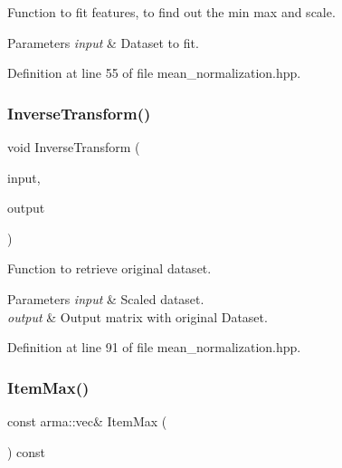 Function to fit features, to find out the min max and scale. 


\begin{DoxyParams}{Parameters}
{\em input} & Dataset to fit. \\
\hline
\end{DoxyParams}


Definition at line 55 of file mean\+\_\+normalization.\+hpp.

\mbox{\label{classmlpack_1_1data_1_1MeanNormalization_afb0e67c6fbf5a527f63469bbbf07066c}} 
\subsubsection{Inverse\+Transform()}
{\footnotesize\ttfamily void Inverse\+Transform (\begin{DoxyParamCaption}\item[{const Mat\+Type \&}]{input,  }\item[{Mat\+Type \&}]{output }\end{DoxyParamCaption})\hspace{0.3cm}{\ttfamily [inline]}}



Function to retrieve original dataset. 


\begin{DoxyParams}{Parameters}
{\em input} & Scaled dataset. \\
\hline
{\em output} & Output matrix with original Dataset. \\
\hline
\end{DoxyParams}


Definition at line 91 of file mean\+\_\+normalization.\+hpp.

\mbox{\label{classmlpack_1_1data_1_1MeanNormalization_a5ed43c216f23cf96c432216d6fc2a1c3}} 
\subsubsection{Item\+Max()}
{\footnotesize\ttfamily const arma\+::vec\& Item\+Max (\begin{DoxyParamCaption}{ }\end{DoxyParamCaption}) const\hspace{0.3cm}{\ttfamily [inline]}}



